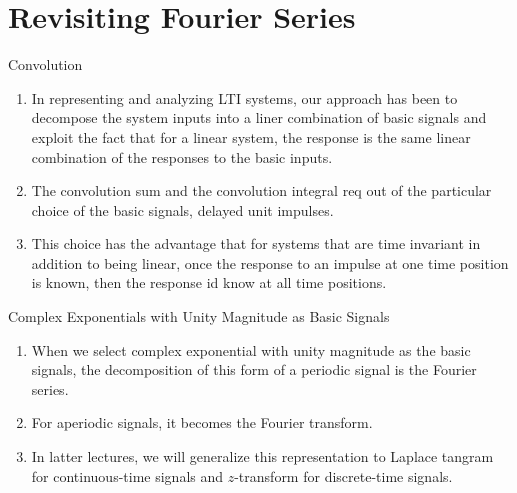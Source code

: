 \section{Revisiting Fourier Series}
\begin{frame}{Convolution}
    \begin{enumerate}
      \item In representing and analyzing LTI systems, our approach has been to decompose the system inputs into a liner combination of basic signals and exploit the fact that for a linear system, the response is the same linear combination of the responses to the basic inputs.
      \item The convolution sum and the convolution integral req out of the particular choice of the basic signals, delayed unit impulses.
      \item This choice has the advantage that for systems that are time invariant in addition to being linear, once the response to an impulse at one time position is known, then the response id know at all time positions.
    \end{enumerate}
\end{frame}

\begin{frame}{Complex Exponentials with Unity Magnitude as Basic Signals}
    \begin{enumerate}
      \item When we select complex exponential with unity magnitude as the basic signals, the decomposition of this form of a periodic signal is the Fourier series.
      \item For aperiodic signals, it becomes the Fourier transform.
      \item In latter lectures, we will generalize this representation to Laplace tangram for continuous-time signals and $z$-transform for discrete-time signals.
    \end{enumerate}
\end{frame}

